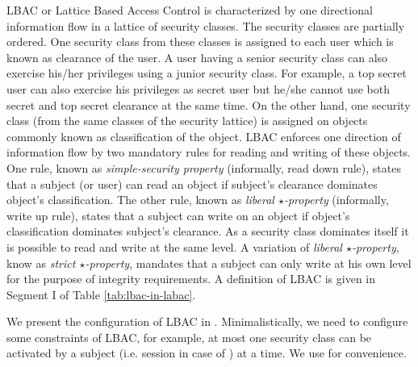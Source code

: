 \newcommand{\latticeHead}{latticeTop} 
\newcommand{\securityClass}{SC}
\newcommand{\liberalStar}{\textit{liberal $\star$-property}}
\newcommand{\strictStar}{\textit{strict $\star$-property}}




LBAC or Lattice Based Access Control is characterized by one directional information flow in a lattice of security classes. The security classes are partially ordered. One security class from these classes is assigned to each user which is known as clearance of the user. A user having a senior security class can also exercise his/her privileges using a junior  security class. For example, a top secret user can also exercise his privileges as secret user but he/she cannot use both secret and top secret clearance at the same time.  On the other hand, one security class (from the same classes of the security lattice) is assigned on objects commonly known as classification of the object. LBAC enforces one direction of information flow by two mandatory rules for reading and writing of these objects. One rule, known as \textit{simple-security property} (informally, read down rule), states that a subject (or user) can read an object if subject's clearance dominates object's classification. The other rule, known as \textit{liberal $\star$-property} (informally, write up rule),  states that a subject can write on an object if object's classification dominates subject's clearance. As a security class dominates itself it is possible to read and write  at the same level. A variation of \textit{liberal $\star$-property}, know as \textit{strict $\star$-property}, mandates that a subject can only write at his own level for the purpose of integrity requirements. A definition of LBAC is given in Segment I of Table \ref{tab:lbac-in-labac}.




 

We present the configuration of LBAC in  \labacOneOneOne{}. Minimalistically, we need \consLabac{}  to configure some constraints of LBAC, for example, at most one security class can be activated by a subject (i.e. session in case of \eapABAC{} ) at a time. We use \labacOneOneOne{} for convenience.  

